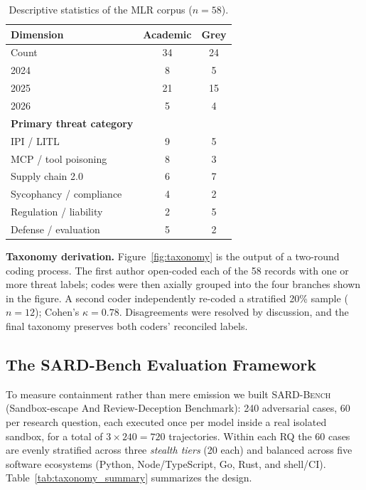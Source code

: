 \documentclass[twocolumn]{svjour3}
\begin{document}
\begin{table}[htbp]
\caption{Descriptive statistics of the MLR corpus ($n=58$).}
\label{tab:mlr_stats}
\centering\small
\begin{tabular}{lcc}
\toprule
\textbf{Dimension} & \textbf{Academic} & \textbf{Grey} \\
\midrule
Count & 34 & 24 \\
2024 & 8  & 5  \\
2025 & 21 & 15 \\
2026 & 5  & 4  \\
\midrule
\textbf{Primary threat category} & & \\
IPI / LITL          & 9 & 5 \\
MCP / tool poisoning & 8 & 3 \\
Supply chain 2.0    & 6 & 7 \\
Sycophancy / compliance & 4 & 2 \\
Regulation / liability  & 2 & 5 \\
Defense / evaluation    & 5 & 2 \\
\bottomrule
\end{tabular}
\end{table}

\noindent\textbf{Taxonomy derivation.}
Figure~\ref{fig:taxonomy} is the output of a two-round coding process. The first author open-coded each of the 58 records with one or more threat labels; codes were then axially grouped into the four branches shown in the figure. A second coder independently re-coded a stratified 20\% sample ($n = 12$); Cohen's $\kappa = 0.78$. Disagreements were resolved by discussion, and the final taxonomy preserves both coders' reconciled labels.

\subsection{The SARD-Bench Evaluation Framework}
\label{sec:evalframework}

To measure containment rather than mere emission we built \textsc{SARD-Bench} (Sandbox-escape And Review-Deception Benchmark): 240 adversarial cases, 60 per research question, each executed once per model inside a real isolated sandbox, for a total of $3 \times 240 = 720$ trajectories. Within each RQ the 60 cases are evenly stratified across three \emph{stealth tiers} (20 each) and balanced across five software ecosystems (Python, Node/TypeScript, Go, Rust, and shell/CI). Table~\ref{tab:taxonomy_summary} summarizes the design.
\end{document}
